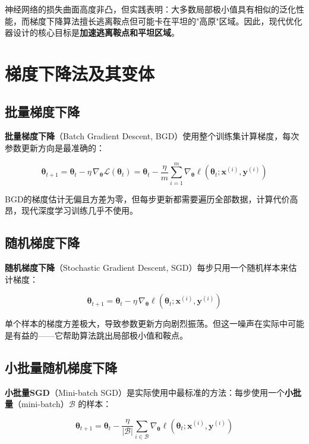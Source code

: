 \begin{remark}
神经网络的损失曲面高度非凸，但实践表明：大多数局部极小值具有相似的泛化性能，而梯度下降算法擅长逃离鞍点但可能卡在平坦的"高原"区域。因此，现代优化器设计的核心目标是\textbf{加速逃离鞍点和平坦区域}。
\end{remark}

\section{梯度下降法及其变体}

\subsection{批量梯度下降}

\textbf{批量梯度下降}（Batch Gradient Descent, BGD）使用整个训练集计算梯度，每次参数更新方向是最准确的：

\[
\boldsymbol{\theta}_{t+1} = \boldsymbol{\theta}_t - \eta\,\nabla_{\boldsymbol{\theta}}\mathcal{L}(\boldsymbol{\theta}_t) = \boldsymbol{\theta}_t - \frac{\eta}{m}\sum_{i=1}^{m} \nabla_{\boldsymbol{\theta}}\ell(\boldsymbol{\theta}_t; \mathbf{x}^{(i)}, \mathbf{y}^{(i)})
\]

BGD的梯度估计无偏且方差为零，但每步更新都需要遍历全部数据，计算代价高昂，现代深度学习训练几乎不使用。

\subsection{随机梯度下降}

\textbf{随机梯度下降}（Stochastic Gradient Descent, SGD）每步只用一个随机样本来估计梯度：

\[
\boldsymbol{\theta}_{t+1} = \boldsymbol{\theta}_t - \eta\,\nabla_{\boldsymbol{\theta}}\ell(\boldsymbol{\theta}_t; \mathbf{x}^{(i)}, \mathbf{y}^{(i)})
\]

单个样本的梯度方差极大，导致参数更新方向剧烈振荡。但这一噪声在实际中可能是有益的——它帮助算法跳出局部极小值和鞍点。

\subsection{小批量随机梯度下降}

\textbf{小批量SGD}（Mini-batch SGD）是实际使用中最标准的方法：每步使用一个\textbf{小批量}（mini-batch）$\mathcal{B}$ 的样本：

\[
\boldsymbol{\theta}_{t+1} = \boldsymbol{\theta}_t - \frac{\eta}{|\mathcal{B}|}\sum_{i\in\mathcal{B}} \nabla_{\boldsymbol{\theta}}\ell(\boldsymbol{\theta}_t; \mathbf{x}^{(i)}, \mathbf{y}^{(i)})
\]

